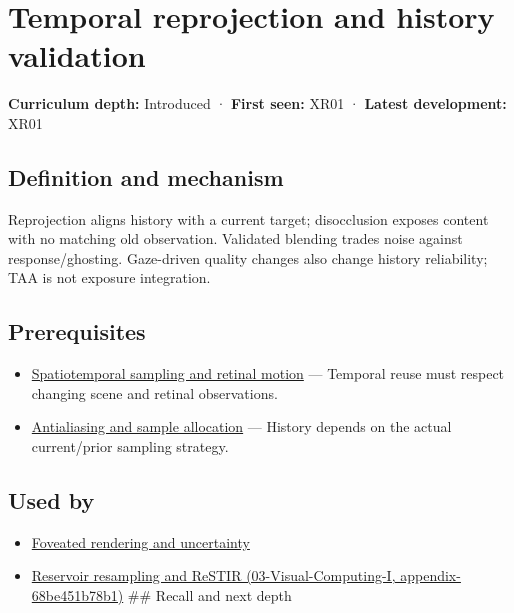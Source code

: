 \hypertarget{appendix-0727340a4428}{}
\section{Temporal reprojection and history validation}\label{appendix-0727340a4428-temporal-reprojection-and-history-validation}

\textbf{Curriculum depth:} Introduced · \textbf{First seen:} XR01 · \textbf{Latest development:} XR01

\subsection{Definition and mechanism}\label{appendix-0727340a4428-definition-and-mechanism}

Reprojection aligns history with a current target; disocclusion exposes content with no matching old observation. Validated blending trades noise against response/ghosting. Gaze-driven quality changes also change history reliability; TAA is not exposure integration.

\subsection{Prerequisites}\label{appendix-0727340a4428-prerequisites}

\begin{itemize}
\tightlist
\item
  \hyperref[appendix-70895739febb]{Spatiotemporal sampling and retinal motion} --- Temporal reuse must respect changing scene and retinal observations.
\item
  \hyperref[appendix-4192b2bdd21e]{Antialiasing and sample allocation} --- History depends on the actual current/prior sampling strategy.
\end{itemize}

\subsection{Used by}\label{appendix-0727340a4428-used-by}

\begin{itemize}
\item
  \hyperref[appendix-5878b813b732]{Foveated rendering and uncertainty}
\item
  \href{../03-Visual-Computing-I/main.pdf\#nameddest=appendix-68be451b78b1}{Reservoir resampling and ReSTIR (03-Visual-Computing-I, appendix-68be451b78b1)} \#\# Recall and next depth
\end{itemize}

